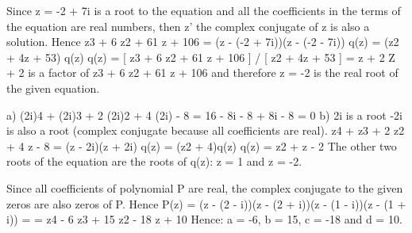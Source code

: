 Since z = -2 + 7i is a root to the equation and all the coefficients in the terms of the equation are real numbers, then z' the complex conjugate of z is also a solution. Hence 
z3 + 6 z2 + 61 z + 106 = (z - (-2 + 7i))(z - (-2 - 7i)) q(z) 
= (z2 + 4z + 53) q(z) 
q(z) = [ z3 + 6 z2 + 61 z + 106 ] / [ z2 + 4z + 53 ] = z + 2 
Z + 2 is a factor of z3 + 6 z2 + 61 z + 106 and therefore z = -2 is the real root of the given equation. 

a) (2i)4 + (2i)3 + 2 (2i)2 + 4 (2i) - 8 
= 16 - 8i - 8 + 8i - 8 = 0 
b) 2i is a root -2i is also a root (complex conjugate because all coefficients are real). 
z4 + z3 + 2 z2 + 4 z - 8 = (z - 2i)(z + 2i) q(z) 
= (z2 + 4)q(z) 
q(z) = z2 + z - 2 
The other two roots of the equation are the roots of q(z): z = 1 and z = -2. 

Since all coefficients of polynomial P are real, the complex conjugate to the given zeros are also zeros of P. Hence 
P(z) = (z - (2 - i))(z - (2 + i))(z - (1 - i))(z - (1 + i)) = 
= z4 - 6 z3 + 15 z2 - 18 z + 10 
Hence: a = -6, b = 15, c = -18 and d = 10. 

